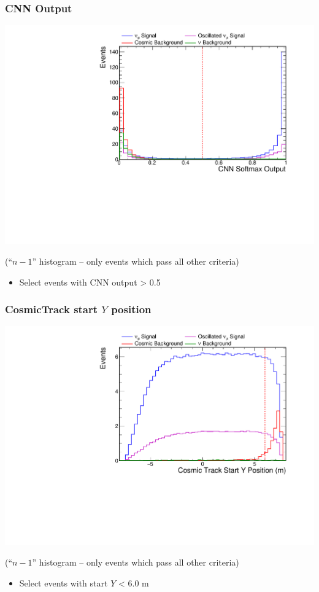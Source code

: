 \documentclass[10pt,professionalfonts,xcolor=table]{beamer}
\begin{document}
\begin{frame}
\frametitle{CNN Output}

  \begin{center}
  \includegraphics[height=0.7\textwidth, angle=-90]{figures/selection/n1_cvnnumu.pdf}

  {\footnotesize(``$n-1$'' histogram -- only events which pass all other criteria)}
  \end{center}
  \begin{itemize}
  \item Select events with CNN output > 0.5
  \end{itemize}
\end{frame}



\begin{frame}
\frametitle{CosmicTrack start $Y$ position}

  \begin{center}
  \includegraphics[height=0.7\textwidth, angle=-90]{figures/selection/n1_cosStartY.pdf}

  {\footnotesize(``$n-1$'' histogram -- only events which pass all other criteria)}
  \end{center}
  \begin{itemize}
  \item Select events with start $Y$ < 6.0 m
  \end{itemize}
\end{frame}
\end{document}
